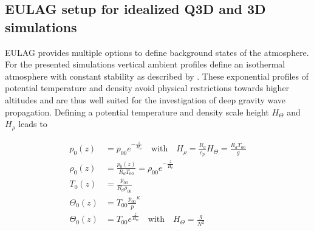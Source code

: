 







\subsection{EULAG setup for idealized Q3D and 3D simulations}

EULAG provides multiple options to define background states of the atmosphere. For the presented simulations vertical ambient profiles define an isothermal atmosphere with constant stability as described by \textcite{bacmeister_breakdown_1989}. These exponential profiles of potential temperature and density avoid physical restrictions towards higher altitudes and are thus well suited for the investigation of deep gravity wave propagation. Defining a potential temperature and density scale height $H_{\Theta}$ and $H_{\rho}$ leads to

\begin{equation}
\begin{aligned}
    p_0(z) &= p_{00} e^{-\frac{z}{H_{\rho}}} \quad \textrm{with} \quad H_{\rho} = \frac{R_d}{c_p} H_{\Theta} = \frac{R_d T_{00}}{g} \\
    \rho_0(z) &= \frac{p_0(z)}{R_d T_{00}} = \rho_{00} e^{-\frac{z}{H_{\rho}}} \\
    T_0(z) &= \frac{p_{00}}{R_d \rho_{00}} \\
    \Theta_0(z) &= T_{00} \frac{p_{00}}{p}^{\kappa} \\
    \Theta_0(z) &= T_{00} e^{\frac{z}{H_{\Theta}}} \quad \textrm{with} \quad H_{\Theta} = \frac{g}{N^2} \\
    \label{equ:ambient-Profiles}
\end{aligned}
\end{equation}

